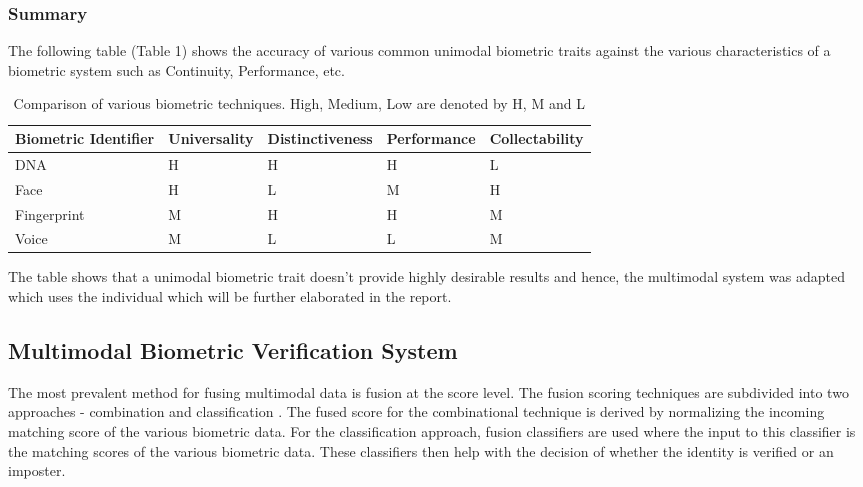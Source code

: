 \documentclass[a4paper, 12pt]{article}
\begin{document}
\subsubsection{Summary}
The following table (Table 1) shows the accuracy of various common unimodal biometric traits against the various characteristics of a biometric system such as Continuity, Performance, etc.
\vskip 0.2in
\begin{table}[h!]
\caption{Comparison of various biometric techniques.  
High, Medium, Low are denoted by H, M and L \cite{jain:2004}}
\label{table:1}
\vskip 0.05in
\begin{tabularx}{1.0\textwidth} { 
  | >{\raggedright\arraybackslash}X 
  | >{\raggedright\arraybackslash}X 
  | >{\raggedright\arraybackslash}X
  | >{\raggedright\arraybackslash}X
  | >{\raggedright\arraybackslash}X|}
 \hline
 \textbf{Biometric Identifier} & \textbf{Universality} & \textbf{Distinctiveness} & \textbf{Performance} & \textbf{Collectability} \\
 \hline
 DNA & H & H & H & L \\
 \hline
 Face & H & L & M & H \\
 \hline
 Fingerprint & M & H & H & M \\ 
 \hline
 Voice & M & L & L & M \\
 \hline
\end{tabularx}
\end{table}
\vskip 0.1in
\noindent The table shows that a unimodal biometric trait doesn’t provide highly desirable results and hence, the multimodal system was adapted which uses the individual which will be further elaborated in the report.
\vskip 0.2in
\subsection{Multimodal Biometric Verification System}
The most prevalent method for fusing multimodal data is fusion at the score level. The fusion scoring techniques are subdivided into two approaches - combination and classification \cite{telgad:2014}. The fused score for the combinational technique is derived by normalizing the incoming matching score of the various biometric data. For the classification approach, fusion classifiers are used where the input to this classifier is the matching scores of the various biometric data. These classifiers then help with the decision of whether the identity is verified or an imposter.
\vskip 0.2in
\end{document}
